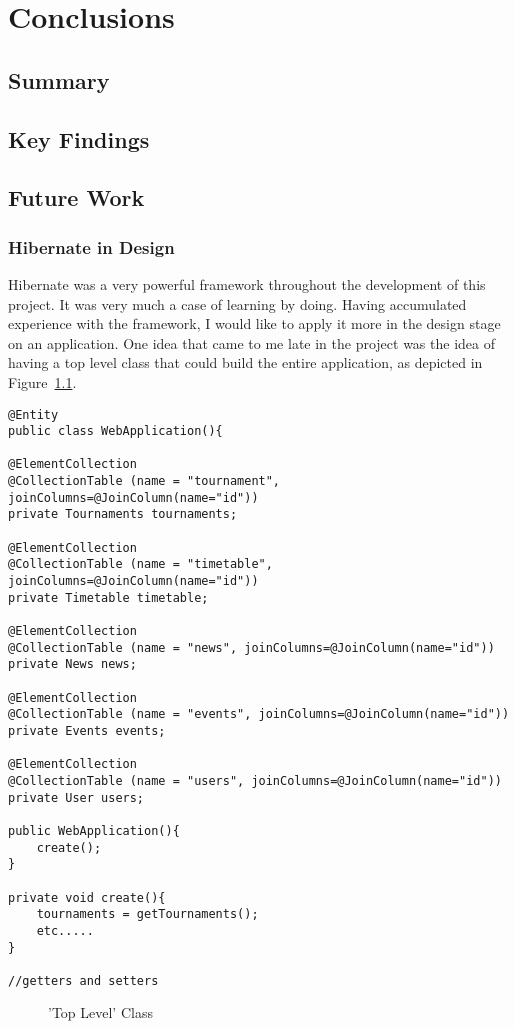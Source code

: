 \chapter{Conclusions}
\label{conclusion}

\section{Summary}

\section{Key Findings}

\section{Future Work}

\subsection{Hibernate in Design}
Hibernate was a very powerful framework throughout the development of this project. It was very much a case of learning by doing. Having accumulated experience with the framework, I would like to apply it more in the design stage on an application. One idea that came to me late in the project was the idea of having a top level class that could build the entire application, as depicted in Figure~\ref{fig:toplevel}.


\begin{lstlisting}
@Entity
public class WebApplication(){

@ElementCollection
@CollectionTable (name = "tournament", joinColumns=@JoinColumn(name="id"))
private Tournaments tournaments;

@ElementCollection
@CollectionTable (name = "timetable", joinColumns=@JoinColumn(name="id"))
private Timetable timetable;

@ElementCollection
@CollectionTable (name = "news", joinColumns=@JoinColumn(name="id"))
private News news;

@ElementCollection
@CollectionTable (name = "events", joinColumns=@JoinColumn(name="id"))
private Events events;

@ElementCollection
@CollectionTable (name = "users", joinColumns=@JoinColumn(name="id"))
private User users;

public WebApplication(){
	create();
}

private void create(){
	tournaments = getTournaments();
	etc.....
}

//getters and setters

\end{lstlisting}
\begin{figure}[H]
\caption{'Top Level' Class}
\label{fig:toplevel}
\end{figure}

